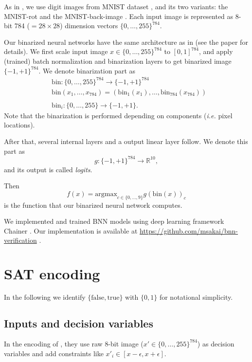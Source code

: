 \documentclass[conference]{IEEEtran}
\begin{document}
As in \cite{bnnverif}, we use digit images from MNIST dataset \cite{mnist}, and its two variants: the MNIST-rot and the MNIST-back-image \cite{mnist-variation}. Each input image is represented as 8-bit 784 ($= 28\times 28$) dimension vectors $\{0,\ldots,255\}^{784}$.

Our binarized neural networks have the same architecture as in \cite{bnnverif} (see the paper for details).
We first scale input image $x \in \{0,\ldots,255\}^{784}$ to $[0,1]^{784}$, and apply (trained) batch normalization and binarization layers to get binarized image $\{-1,+1\}^{784}$.
We denote binarization part as
\begin{align*}
&\mathrm{bin} : \{0,\ldots,255\}^{784} \to \{-1,+1\}^{784} \\
&\mathrm{bin}(x_1, \ldots, x_{784}) = (\mathrm{bin}_1 (x_1), \ldots, \mathrm{bin}_{784} (x_{784})) \\
\\
&\mathrm{bin}_i : \{0,\ldots,255\} \to \{-1,+1\}.
\end{align*}
Note that the binarization is performed depending on components (\textit{i.e.} pixel locations).

After that, several internal layers and a output linear layer follow. We denote this part as
\[
g : \{-1,+1\}^{784} \to \mathbb{R}^{10},
\]
and its output is called \textit{logits}.

Then 
\[
f(x) = \mathrm{argmax}_{c\in \{0,\ldots,9\}}  g(\mathrm{bin}(x))_c
\]
is the function that our binarized neural network computes. 

We implemented and trained BNN models using deep learning framework Chainer \cite{chainer}.
Our implementation is available at \url{https://github.com/msakai/bnn-verification} .

\section{SAT encoding}

In the following we identify $\{\mathrm{false},\mathrm{true}\}$ with $\{0,1\}$ for notational simplicity.

\subsection{Inputs and decision variables}

In the encoding of \cite{bnnverif}, they use raw 8-bit image ($x' \in \{0,\ldots,255\}^{784}$) as decision variables and add constraints like $x'_i \in [x -\epsilon, x + \epsilon]$.
\end{document}
